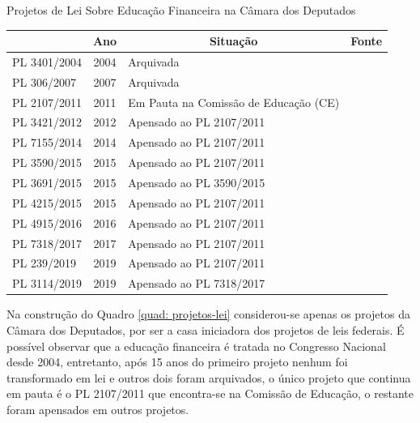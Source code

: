 \begin{quadro}[!ht]
\caption{Projetos de Lei Sobre Educação Financeira na Câmara dos Deputados}
\centering
\begin{tabular}{|l|c|l|l|}\hline
\rowcolor[rgb]{0.867,0.922,0.969} \multicolumn{1}{|c|}{\textbf{Projeto de Lei}} & \textbf{Ano} & \multicolumn{1}{c|}{\textbf{Situação}} & \multicolumn{1}{c|}{\textbf{Fonte}}  \\
\hline \hline
PL 3401/2004 & 2004 & Arquivada & \cite{projeto3401} \\ \hline
PL 306/2007 & 2007 & Arquivada & \cite{projeto306} \\ \hline
PL 2107/2011 & 2011 & Em Pauta na Comissão de Educação (CE) & \cite{projeto2107} \\ \hline
PL 3421/2012 & 2012 & Apensado ao PL 2107/2011 & \cite{projeto3421} \\ \hline
PL 7155/2014 & 2014 & Apensado ao PL 2107/2011 & \cite{projeto7155} \\ \hline
PL 3590/2015 & 2015 & Apensado ao PL 2107/2011 & \cite{projeto3590} \\ \hline
PL 3691/2015 & 2015 & Apensado ao PL 3590/2015 & \cite{projeto3691} \\ \hline
PL 4215/2015 & 2015 & Apensado ao PL 2107/2011 & \cite{projeto4215} \\ \hline
PL 4915/2016 & 2016 & Apensado ao PL 2107/2011 & \cite{projeto4915} \\ \hline
PL 7318/2017 & 2017 & Apensado ao PL 2107/2011 & \cite{projeto7318} \\ \hline
PL 239/2019 & 2019 & Apensado ao PL 2107/2011 & \cite{projeto239} \\ \hline
PL 3114/2019  & 2019 & Apensado ao PL 7318/2017 & \cite{projeto3114} \\ \hline
\end{tabular}
\label{quad: projetos-lei}
\vspace{0.2cm} 
\end{quadro}

Na construção do Quadro \ref{quad: projetos-lei} considerou-se apenas os projetos da Câmara dos Deputados, por ser a casa iniciadora dos projetos de leis federais. É possível observar que a educação financeira é tratada no Congresso Nacional desde 2004, entretanto, após 15 anos do primeiro projeto nenhum foi transformado em lei e outros dois foram arquivados, o único projeto que continua em pauta é o PL 2107/2011 que encontra-se na Comissão de Educação, o restante foram apensados em outros projetos.

